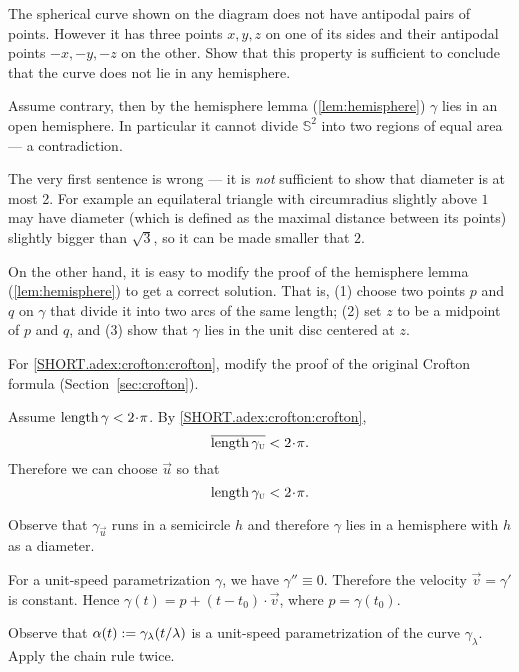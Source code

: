 The spherical curve shown on the diagram does not have antipodal pairs of points.
However it has three points $x,y,z$ on one of its sides and their antipodal points $-x,-y,-z$ on the other.
Show that this property is sufficient to conclude that the curve does not lie in any hemisphere.

Assume contrary, then by the hemisphere lemma (\ref{lem:hemisphere}) $\gamma$ lies in an open hemisphere.
In particular it cannot divide $\mathbb{S}^2$ into two regions of equal area --- a contradiction.

The very first sentence is wrong --- it is {}\emph{not} sufficient to show that diameter is at most 2.
For example an equilateral triangle with circumradius slightly above $1$ may have diameter (which is defined as the maximal distance between its points) slightly bigger than $\sqrt3$, so it can be made smaller that $2$.

On the other hand, it is easy to modify the proof of the hemisphere lemma (\ref{lem:hemisphere}) to get a correct solution.
That is, (1) choose two points $p$ and $q$ on $\gamma$ that divide it into two arcs of the same length;
(2) set $z$ to be a midpoint of $p$ and $q$,
and (3) show that $\gamma$ lies in the unit disc centered at $z$.


For \ref{SHORT.adex:crofton:crofton}, modify the proof of the original Crofton formula
(Section~\ref{sec:crofton}).

Assume $\length \gamma<2\cdot\pi$.
By \ref{SHORT.adex:crofton:crofton},
\[\overline{\length \gamma_{\vec u}}<2\cdot\pi.\]
Therefore we can choose ${\vec u}$ so that 
\[\length \gamma_{\vec u}<2\cdot\pi.\]

Observe that $\gamma_{\vec u}$ runs in a semicircle $h$ and therefore $\gamma$ lies in a hemisphere with $h$ as a diameter.

\setcounter{eqtn}{0}


For a unit-speed parametrization $\gamma$, we have $\gamma''\equiv 0$.
Therefore the velocity $\vec v=\gamma'$ is constant.
Hence $\gamma(t)=p+(t-t_0)\cdot \vec v$, where $p=\gamma(t_0)$.


Observe that $\alpha(t)\mathrel{:=}\gamma_{\lambda}(t/\lambda)$ is a unit-speed parametrization of the curve $ \gamma_{\lambda}$.
Apply the chain rule twice.


